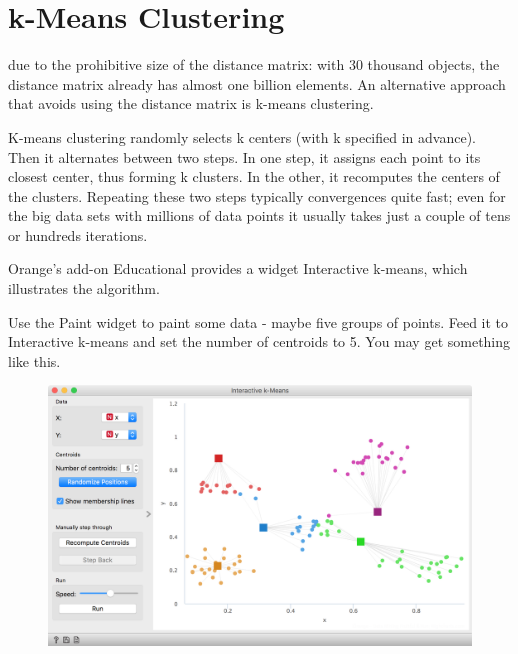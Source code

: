 \chapter{k-Means Clustering}
\label{ch:kmeans-clustering}

 due to the prohibitive size of the distance matrix: with 30 thousand objects, the distance matrix already has almost one billion elements. An alternative approach that avoids using the distance matrix is k-means clustering.

K-means clustering randomly selects k centers (with k specified in advance). Then it alternates between two steps. In one step, it assigns each point to its closest center, thus forming k clusters. In the other, it recomputes the centers of the clusters. Repeating these two steps typically convergences quite fast; even for the big data sets with millions of data points it usually takes just a couple of tens or hundreds iterations.

Orange's add-on Educational provides a widget Interactive k-means, which illustrates the algorithm.

Use the Paint widget to paint some data - maybe five groups of points. Feed it to Interactive k-means and set the number of centroids to 5. You may get something like this.


\begin{figure}[h]
    \centering
    \includegraphics[width=\linewidth]{interactive-kmeans.png}
    \caption{$\;$} %
\end{figure}

